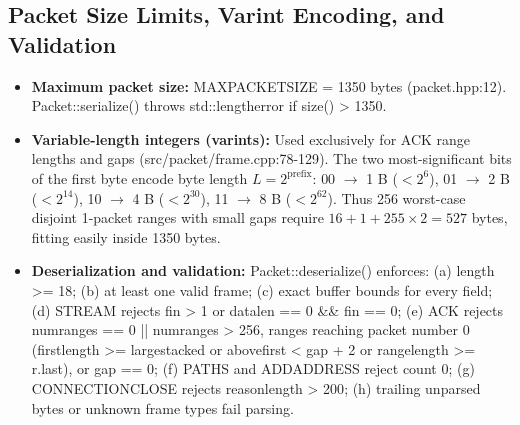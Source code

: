 \documentclass[10pt,a4paper]{article}
\newcommand{\codeul}{\textunderscore\hspace{0pt}}
\DeclareRobustCommand{\code}[1]{{\ttfamily\let\_\codeul #1}}
\begin{document}
\subsection{Packet Size Limits, Varint Encoding, and Validation}
\begin{itemize}
    \item \textbf{Maximum packet size:} \code{MAX\_PACKET\_SIZE = 1350} bytes (\code{packet.hpp:12}). \code{Packet::serialize()} throws \code{std::length\_error} if \code{size() > 1350}.
    \item \textbf{Variable-length integers (varints):} Used exclusively for ACK range lengths and gaps (\code{src/\hspace{0pt}packet/\hspace{0pt}frame.cpp:78-129}). The two most-significant bits of the first byte encode byte length $L = 2^{\text{prefix}}$: \code{00} $\rightarrow$ 1 B ($< 2^6$), \code{01} $\rightarrow$ 2 B ($< 2^{14}$), \code{10} $\rightarrow$ 4 B ($< 2^{30}$), \code{11} $\rightarrow$ 8 B ($< 2^{62}$). Thus 256 worst-case disjoint 1-packet ranges with small gaps require $16 + 1 + 255 \times 2 = 527$ bytes, fitting easily inside 1350 bytes.
    \item \textbf{Deserialization and validation:} \code{Packet::deserialize()} enforces: (a) \code{length >= 18}; (b) at least one valid frame; (c) exact buffer bounds for every field; (d) \code{STREAM} rejects \code{fin > 1} or \code{data\_len == 0 \&\& fin == 0}; (e) \code{ACK} rejects \code{num\_ranges == 0 || num\_ranges > 256}, ranges reaching packet number 0 (\code{first\_length >= largest\_acked} or \code{above\_first < gap + 2} or \code{range\_length >= r.last}), or \code{gap == 0}; (f) \code{PATHS} and \code{ADD\_ADDRESS} reject count $0$; (g) \code{CONNECTION\_CLOSE} rejects \code{reason\_length > 200}; (h) trailing unparsed bytes or unknown frame types fail parsing.
\end{itemize}
\end{document}

